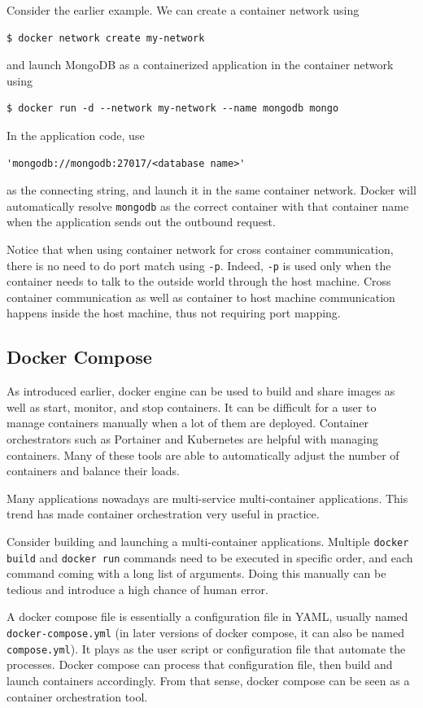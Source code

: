 Consider the earlier example. We can create a container network using
\begin{lstlisting}
$ docker network create my-network
\end{lstlisting}
and launch MongoDB as a containerized application in the container network using
\begin{lstlisting}
$ docker run -d --network my-network --name mongodb mongo
\end{lstlisting}
In the application code, use
\begin{lstlisting}
'mongodb://mongodb:27017/<database name>'	
\end{lstlisting}
as the connecting string, and launch it in the same container network. Docker will automatically resolve \verb|mongodb| as the correct container with that container name when the application sends out the outbound request.

Notice that when using container network for cross container communication, there is no need to do port match using \verb|-p|. Indeed, \verb|-p| is used only when the container needs to talk to the outside world through the host machine. Cross container communication as well as container to host machine communication happens inside the host machine, thus not requiring port mapping.

\subsection{Docker Compose}

As introduced earlier, docker engine can be used to build and share images as well as start, monitor, and stop containers. It can be difficult for a user to manage containers manually when a lot of them are deployed. Container orchestrators such as Portainer and Kubernetes are helpful with managing containers. Many of these tools are able to automatically adjust the number of containers and balance their loads.

Many applications nowadays are multi-service multi-container applications. This trend has made container orchestration very useful in practice.

Consider building and launching a multi-container applications. Multiple \verb|docker build| and \verb|docker run| commands need to be executed in specific order, and each command coming with a long list of arguments. Doing this manually can be tedious and introduce a high chance of human error.

A docker compose file is essentially a configuration file in YAML, usually named \verb|docker-compose.yml| (in later versions of docker compose, it can also be named \verb|compose.yml|). It plays as the user script or configuration file that automate the processes. Docker compose can process that configuration file, then build and launch containers accordingly. From that sense, docker compose can be seen as a container orchestration tool. 


